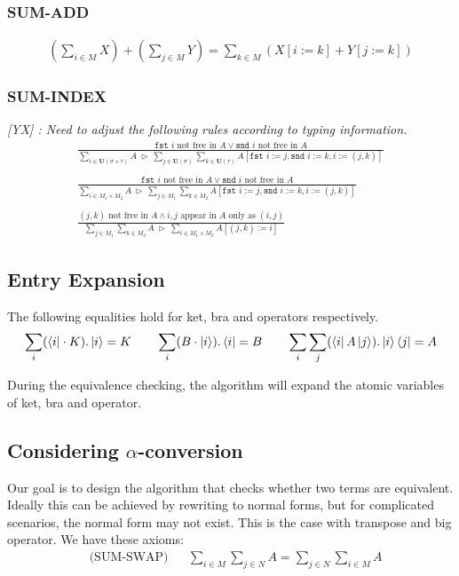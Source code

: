 \documentclass[manuscript, review, timestamp]{acmart}
\newcommand{\yx}[1]{\textit{\color{blue}[YX] : #1}}
\newcommand*{\fst}{\texttt{fst }}
\newcommand*{\snd}{\texttt{snd }}
\newcommand*{\reduce}{\ \triangleright\ }
\begin{document}
\subsubsection*{SUM-ADD}
\begin{gather*}
  (\sum_{i \in M} X) + (\sum_{j \in M} Y) = \sum_{k \in M} (X[i:=k] + Y[j:=k])
\end{gather*}

\subsubsection*{SUM-INDEX}
\yx{Need to adjust the following rules according to typing information.}
\begin{gather*}
  \frac{\fst i \text{ not free in } A \vee \snd i \text{ not free in } A}{\sum_{i\in\mathbf{U}(\sigma \times \tau)}A \reduce \sum_{j\in\mathbf{U}(\sigma)}\sum_{k\in\mathbf{U}(\tau)}A[\fst i:=j, \snd i:=k, i:=(j,k)]}
  \\
  \\
  \frac{\fst i \text{ not free in } A \vee \snd i \text{ not free in } A}{\sum_{i\in M_1 \times M_2}A \reduce \sum_{j\in M_1}\sum_{k\in M_2}A[\fst i:=j, \snd i:=k, i:=(j,k)]}
  \\
  \\
  \frac{(j, k) \text{ not free in } A \wedge i, j \text{ appear in } A \text{ only as } (i, j)}{\sum_{j\in M_1}\sum_{k\in M_2}A \reduce \sum_{i\in M_1\times M_2}A[(j,k):=i]}
\end{gather*}

\subsection{Entry Expansion}

The following equalities hold for ket, bra and operators respectively. 
\begin{gather*}
  \sum_i (\bra{i} \cdot K).\ket{i} = K
  \qquad
  \sum_i (B \cdot \ket{i}).\bra{i} = B
  \qquad
  \sum_i \sum_j (\bra{i} A \ket{j}).\ket{i}\bra{j} = A
\end{gather*}

During the equivalence checking, the algorithm will expand the atomic variables of ket, bra and operator.

\subsection{Considering $\alpha$-conversion}

Our goal is to design the algorithm that checks whether two terms are equivalent. Ideally this can be achieved by rewriting to normal forms, but for complicated scenarios, the normal form may not exist. This is the case with transpose and big operator. We have these axioms: 
\begin{align*}
& \text{(SUM-SWAP)} && \sum_{i \in M} \sum_{j \in N} A = \sum_{j \in N} \sum_{i \in M} A 
\end{align*}
\end{document}
